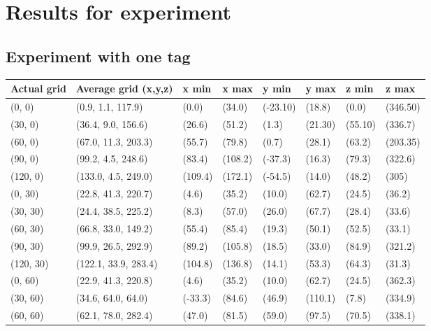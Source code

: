 \section{Results for experiment}
\label{app:experiment}

\subsection{Experiment with one tag}
\label{app:one-tag}
\begin{table}[H]
    \begin{tabular}{|l|l|l|l|l|l|l|l|}
    \hline
    Actual grid & Average grid (x,y,z)  & x min   & x max   & y min    & y max   & z min   & z max    \\ \hline
    (0, 0)      & (0.9, 1.1, 117.9)     & (0.0)   & (34.0)  & (-23.10) & (18.8)  & (0.0)   & (346.50) \\ \hline
    (30, 0)     & (36.4, 9.0, 156.6)    & (26.6)  & (51.2)  & (1.3)    & (21.30) & (55.10) & (336.7)  \\ \hline
    (60, 0)     & (67.0, 11.3, 203.3)   & (55.7)  & (79.8)  & (0.7)    & (28.1)  & (63.2)  & (203.35) \\ \hline
    (90, 0)     & (99.2, 4.5, 248.6)    & (83.4)  & (108.2) & (-37.3)  & (16.3)  & (79.3)  & (322.6)  \\ \hline
    (120, 0)    & (133.0, 4.5, 249.0)   & (109.4) & (172.1) & (-54.5)  & (14.0)  & (48.2)  & (305)    \\ \hline
    (0, 30)     & (22.8, 41.3, 220.7)   & (4.6)   & (35.2)  & (10.0)   & (62.7)  & (24.5)  & (36.2)   \\ \hline
    (30, 30)    & (24.4, 38.5, 225.2)   & (8.3)   & (57.0)  & (26.0)   & (67.7)  & (28.4)  & (33.6)   \\ \hline
    (60, 30)    & (66.8, 33.0, 149.2)   & (55.4)  & (85.4)  & (19.3)   & (50.1)  & (52.5)  & (33.1)   \\ \hline
    (90, 30)    & (99.9, 26.5, 292.9)   & (89.2)  & (105.8) & (18.5)   & (33.0)  & (84.9)  & (321.2)  \\ \hline
    (120, 30)   & (122.1, 33.9, 283.4)  & (104.8) & (136.8) & (14.1)   & (53.3)  & (64.3)  & (31.3)   \\ \hline
    (0, 60)     & (22.9, 41.3, 220.8)   & (4.6)   & (35.2)  & (10.0)   & (62.7)  & (24.5)  & (362.3)  \\ \hline
    (30, 60)    & (34.6, 64.0, 64.0)    & (-33.3) & (84.6)  & (46.9)   & (110.1) & (7.8)   & (334.9)  \\ \hline
    (60, 60)    & (62.1, 78.0, 282.4)   & (47.0)  & (81.5)  & (59.0)   & (97.5)  & (70.5)  & (338.1)  \\ \hline

\end{tabular}
\end{table}
